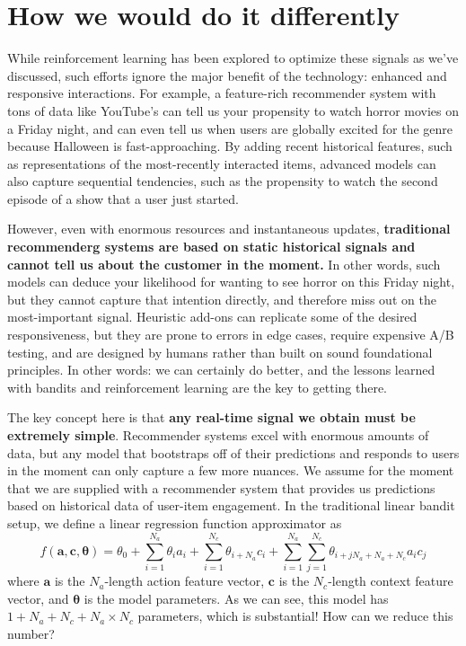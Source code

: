 \documentclass{article}
\begin{document}
\section{How we would do it differently}

While reinforcement learning has been explored to optimize these signals as we've discussed, such efforts ignore the major benefit of the technology: enhanced and responsive interactions. For example, a feature-rich recommender system with tons of data like YouTube's can tell us your propensity to watch horror movies on a Friday night, and can even tell us when users are globally excited for the genre because Halloween is fast-approaching. By adding recent historical features, such as representations of the most-recently interacted items, advanced models can also capture sequential tendencies, such as the propensity to watch the second episode of a show that a user just started. 

However, even with enormous resources and instantaneous updates, \textbf{traditional recommenderg systems are based on static historical signals and cannot tell us about the customer in the moment.} In other words, such models can deduce your likelihood for wanting to see horror on this Friday night, but they cannot capture that intention directly, and therefore miss out on the most-important signal. Heuristic add-ons can replicate some of the desired responsiveness, but they are prone to errors in edge cases, require expensive A/B testing, and are designed by humans rather than built on sound foundational principles. In other words: we can certainly do better, and the lessons learned with bandits and reinforcement learning are the key to getting there.

The key concept here is that \textbf{any real-time signal we obtain must be extremely simple}. Recommender systems excel with enormous amounts of data, but any model that bootstraps off of their predictions and responds to users in the moment can only capture a few more nuances. We assume for the moment that we are supplied with a recommender system that provides us predictions based on historical data of user-item engagement. In the traditional linear bandit setup, we define a linear regression function approximator as
\begin{equation}
    f(\mathbf{a},\mathbf{c},\boldsymbol{\theta}) = \theta_0 + \sum_{i=1}^{N_a}\theta_i a_i+\sum_{i=1}^{N_c}\theta_{i+N_a}c_i+\sum_{i=1}^{N_a}\sum_{j=1}^{N_c}\theta_{i+jN_a+N_a+N_c} a_i c_j
\end{equation}where $\mathbf{a}$ is the $N_a$-length action feature vector, $\mathbf{c}$ is the $N_c$-length context feature vector, and $\boldsymbol{\theta}$ is the model parameters. As we can see, this model has $1+N_a+N_c+N_a\times N_c$ parameters, which is substantial! How can we reduce this number?
\end{document}
